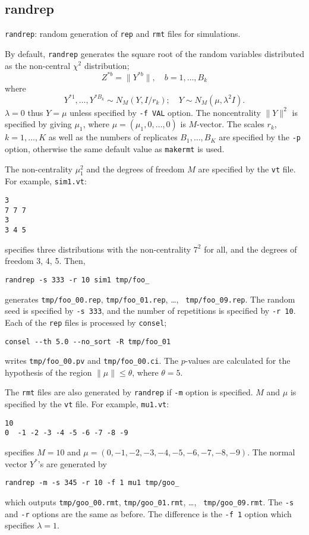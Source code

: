 \documentclass[12pt]{article}
\begin{document}
\subsection{randrep}

{\tt randrep}: random generation of {\tt rep} and {\tt rmt} files for
simulations.

\bigskip

By default, {\tt randrep} generates the square root of the random
variables distributed as the non-central $\chi^2$ distribution;
\[
 Z^{*b} = \|Y^{*b}\|, \quad b=1,\ldots,B_k
\]
where
\begin{equation} \label{eq:YY}
 Y^{*1},\ldots,Y^{*B_k} \sim N_M(Y,I/r_k); 
\quad Y\sim N_M(\mu, \lambda^2 I).
\end{equation}
$\lambda=0$ thus $Y=\mu$ unless specified by {\tt -f VAL} option. The
noncentrality $\|Y\|^2$ is specified by giving $\mu_1$, where
$\mu=(\mu_1,0,\ldots,0)$ is $M$-vector. The scales $r_k$, $k=1,\ldots,K$
as well as the numbers of replicates $B_1,\ldots,B_K$ are specified by
the {\tt -p} option, otherwise the same default value as {\tt makermt}
is used.

The non-centrality $\mu_1^2$ and the degrees of freedom $M$ are
specified by the {\tt vt} file.  For example, {\tt sim1.vt}:
\begin{verbatim}
3
7 7 7
3
3 4 5
\end{verbatim}
specifies three distributions with the non-centrality $7^2$ for all, and
the degrees of freedom 3, 4, 5. Then,
\begin{verbatim}
randrep -s 333 -r 10 sim1 tmp/foo_
\end{verbatim}
generates {\tt tmp/foo\_00.rep}, {\tt tmp/foo\_01.rep}, \ldots, {\tt
tmp/foo\_09.rep}. The random seed is specified by {\tt -s 333}, and the
number of repetitions is specified by {\tt -r 10}. Each of the {\tt rep}
files is processed by {\tt consel};
\begin{verbatim}
consel --th 5.0 --no_sort -R tmp/foo_01  
\end{verbatim}
writes {\tt tmp/foo\_00.pv} and {\tt tmp/foo\_00.ci}. The $p$-values are
calculated for the hypothesis of the region $\|\mu\|\le \theta$, where
$\theta=5$.

The {\tt rmt} files are also generated by {\tt randrep} if {\tt -m}
option is specified. $M$ and $\mu$ is specified by the {\tt vt}
file. For example, {\tt mu1.vt}:
\begin{verbatim}
10
0  -1 -2 -3 -4 -5 -6 -7 -8 -9
\end{verbatim}
specifies $M=10$ and $\mu=(0,-1,-2,-3,-4,-5,-6,-7,-8,-9)$.  The normal
vector $Y^*$'s are generated by
\begin{verbatim}
randrep -m -s 345 -r 10 -f 1 mu1 tmp/goo_	
\end{verbatim}
which outputs {\tt tmp/goo\_00.rmt}, {\tt tmp/goo\_01.rmt}, \ldots, {\tt
tmp/goo\_09.rmt}.  The {\tt -s} and {\tt -r} options are the same as
before. The difference is the {\tt -f 1} option which specifies
$\lambda=1$.
\end{document}
